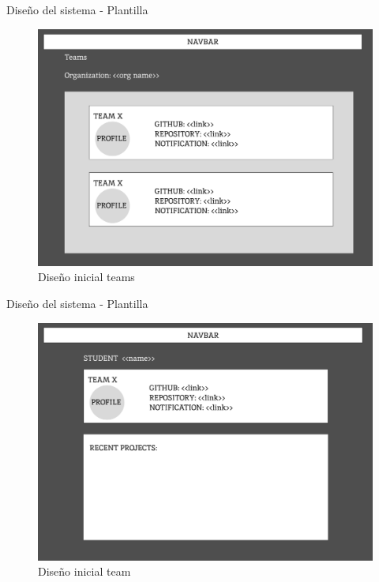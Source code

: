 \documentclass{beamer}
\begin{document}
    \begin{frame}{Diseño del sistema - Plantilla}

        \begin{figure}
            \centering
            \includegraphics[width=.8\textwidth]{Presentacion/mockup/teams.png}
            \caption{Diseño inicial teams}
        \end{figure}
        
    \end{frame}  

    \begin{frame}{Diseño del sistema - Plantilla}

        \begin{figure}
            \centering
            \includegraphics[width=.8\textwidth]{Presentacion/mockup/student.png}
            \caption{Diseño inicial team}
        \end{figure}
        
    \end{frame}  
\end{document}
